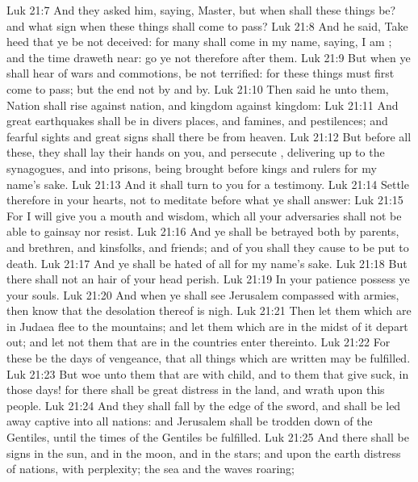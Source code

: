 \vs Luk 21:7 And they asked him, saying, Master, but when shall these things be? and what sign  when these things shall come to pass?
\vs Luk 21:8 And he said, Take heed that ye be not deceived: for many shall come in my name, saying, I am ; and the time draweth near: go ye not therefore after them.
\vs Luk 21:9 But when ye shall hear of wars and commotions, be not terrified: for these things must first come to pass; but the end  not by and by.
\vs Luk 21:10 Then said he unto them, Nation shall rise against nation, and kingdom against kingdom:
\vs Luk 21:11 And great earthquakes shall be in divers places, and famines, and pestilences; and fearful sights and great signs shall there be from heaven.
\vs Luk 21:12 But before all these, they shall lay their hands on you, and persecute , delivering  up to the synagogues, and into prisons, being brought before kings and rulers for my name's sake.
\vs Luk 21:13 And it shall turn to you for a testimony.
\vs Luk 21:14 Settle  therefore in your hearts, not to meditate before what ye shall answer:
\vs Luk 21:15 For I will give you a mouth and wisdom, which all your adversaries shall not be able to gainsay nor resist.
\vs Luk 21:16 And ye shall be betrayed both by parents, and brethren, and kinsfolks, and friends; and  of you shall they cause to be put to death.
\vs Luk 21:17 And ye shall be hated of all  for my name's sake.
\vs Luk 21:18 But there shall not an hair of your head perish.
\vs Luk 21:19 In your patience possess ye your souls.
\vs Luk 21:20 And when ye shall see Jerusalem compassed with armies, then know that the desolation thereof is nigh.
\vs Luk 21:21 Then let them which are in Judaea flee to the mountains; and let them which are in the midst of it depart out; and let not them that are in the countries enter thereinto.
\vs Luk 21:22 For these be the days of vengeance, that all things which are written may be fulfilled.
\vs Luk 21:23 But woe unto them that are with child, and to them that give suck, in those days! for there shall be great distress in the land, and wrath upon this people.
\vs Luk 21:24 And they shall fall by the edge of the sword, and shall be led away captive into all nations: and Jerusalem shall be trodden down of the Gentiles, until the times of the Gentiles be fulfilled.
\vs Luk 21:25 And there shall be signs in the sun, and in the moon, and in the stars; and upon the earth distress of nations, with perplexity; the sea and the waves roaring;
